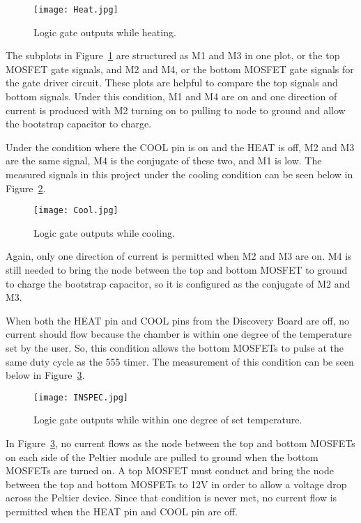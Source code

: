\documentclass[11pt,letter]{article}
\begin{document}
\begin{figure}[H]
    \centering
    \texttt{[image: Heat.jpg]}
    \caption{Logic gate outputs while heating.}
    \label{fig:heatLogic}
\end{figure}

The subplots in Figure~\ref{fig:heatLogic} are structured as M1 and M3 in one plot, or the top MOSFET gate signals, and M2 and M4, or the bottom MOSFET gate signals for the gate driver circuit. These plots are helpful to compare the top signals and bottom signals. Under this condition, M1 and M4 are on and one direction of current is produced with M2 turning on to pulling to node to ground and allow the bootstrap capacitor to charge.

Under the condition where the COOL pin is on and the HEAT is off, M2 and M3 are the same signal, M4 is the conjugate of these two, and M1 is low. The measured signals in this project under the cooling condition can be seen below in Figure~\ref{fig:coolLogic}.

\begin{figure}[H]
    \centering
    \texttt{[image: Cool.jpg]}
    \caption{Logic gate outputs while cooling.}
    \label{fig:coolLogic}
\end{figure}

Again, only one direction of current is permitted when M2 and M3 are on. M4 is still needed to bring the node between the top and bottom MOSFET to ground to charge the bootstrap capacitor, so it is configured as the conjugate of M2 and M3.

When both the HEAT pin and COOL pins from the Discovery Board are off, no current should flow because the chamber is within one degree of the temperature set by the user. So, this condition allows the bottom MOSFETs to pulse at the same duty cycle as the 555 timer. The measurement of this condition can be seen below in Figure~\ref{fig:inSpecLogic}.

\begin{figure}[H]
    \centering
    \texttt{[image: INSPEC.jpg]}
    \caption{Logic gate outputs while within one degree of set temperature.}
    \label{fig:inSpecLogic}
\end{figure}
In Figure~\ref{fig:inSpecLogic}, no current flows as the node between the top and bottom MOSFETs on each side of the Peltier module are pulled to ground when the bottom MOSFETs are turned on. A top MOSFET must conduct and bring the node between the top and bottom MOSFETs to 12V in order to allow a voltage drop across the Peltier device. Since that condition is never met, no current flow is permitted when the HEAT pin and COOL pin are off.
\end{document}
